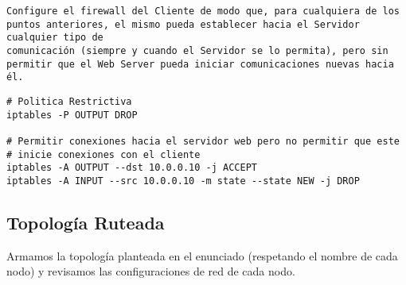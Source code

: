 \texttt{Configure el firewall del Cliente de modo que, para cualquiera de los puntos anteriores, el mismo pueda establecer hacia el Servidor cualquier tipo de \\comunicación (siempre y cuando el Servidor se lo permita), pero sin permitir que el Web Server pueda iniciar comunicaciones nuevas hacia él.}

\begin{lstlisting}
# Politica Restrictiva
iptables -P OUTPUT DROP

# Permitir conexiones hacia el servidor web pero no permitir que este
# inicie conexiones con el cliente
iptables -A OUTPUT --dst 10.0.0.10 -j ACCEPT
iptables -A INPUT --src 10.0.0.10 -m state --state NEW -j DROP
\end{lstlisting}

\subsection*{Topología Ruteada}

Armamos la topología planteada en el enunciado (respetando el nombre de cada nodo) y revisamos las configuraciones de red de cada nodo. 



\pagebreak


\newpage
\printbibliography








